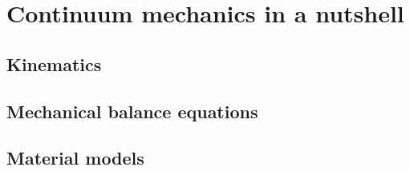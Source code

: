 \chapter{Continuum mechanics in a nutshell}
\section{Kinematics}
\section{Mechanical balance equations}
\section{Material models}